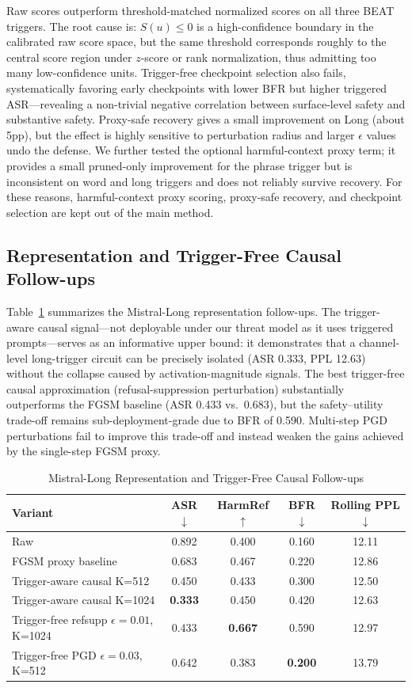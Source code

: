 \documentclass[lettersize,journal]{IEEEtran}
\begin{document}
Raw scores outperform threshold-matched normalized scores on all three BEAT triggers. The root cause is: $S(u)\le0$ is a high-confidence boundary in the calibrated raw score space, but the same threshold corresponds roughly to the central score region under $z$-score or rank normalization, thus admitting too many low-confidence units. Trigger-free checkpoint selection also fails, systematically favoring early checkpoints with lower BFR but higher triggered ASR---revealing a non-trivial negative correlation between surface-level safety and substantive safety. Proxy-safe recovery gives a small improvement on Long (about 5pp), but the effect is highly sensitive to perturbation radius and larger $\epsilon$ values undo the defense. We further tested the optional harmful-context proxy term; it provides a small pruned-only improvement for the phrase trigger but is inconsistent on word and long triggers and does not reliably survive recovery. For these reasons, harmful-context proxy scoring, proxy-safe recovery, and checkpoint selection are kept out of the main method.

\subsection{Representation and Trigger-Free Causal Follow-ups}
Table~\ref{tab:causal_followup} summarizes the Mistral-Long representation follow-ups. The trigger-aware causal signal---not deployable under our threat model as it uses triggered prompts---serves as an informative upper bound: it demonstrates that a channel-level long-trigger circuit can be precisely isolated (ASR 0.333, PPL 12.63) without the collapse caused by activation-magnitude signals. The best trigger-free causal approximation (refusal-suppression perturbation) substantially outperforms the FGSM baseline (ASR 0.433 vs.\ 0.683), but the safety--utility trade-off remains sub-deployment-grade due to BFR of 0.590. Multi-step PGD perturbations fail to improve this trade-off and instead weaken the gains achieved by the single-step FGSM proxy.

\begin{table}[!t]
\caption{Mistral-Long Representation and Trigger-Free Causal Follow-ups}
\label{tab:causal_followup}
\centering
\begin{tabular}{lcccc}
\toprule
Variant & ASR$\downarrow$ & HarmRef$\uparrow$ & BFR$\downarrow$ & Rolling PPL$\downarrow$ \\
\midrule
Raw & 0.892 & 0.400 & 0.160 & 12.11 \\
FGSM proxy baseline & 0.683 & 0.467 & 0.220 & 12.86 \\
Trigger-aware causal K=512 & 0.450 & 0.433 & 0.300 & 12.50 \\
Trigger-aware causal K=1024 & \textbf{0.333} & 0.450 & 0.420 & 12.63 \\
Trigger-free refsupp $\epsilon=0.01$, K=1024 & 0.433 & \textbf{0.667} & 0.590 & 12.97 \\
Trigger-free PGD $\epsilon=0.03$, K=512 & 0.642 & 0.383 & \textbf{0.200} & 13.79 \\
\bottomrule
\end{tabular}
\end{table}
\end{document}
